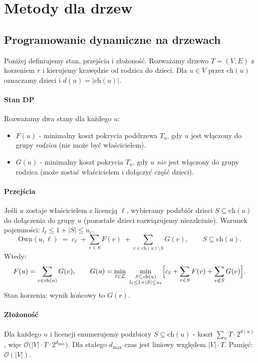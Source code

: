 \section{Metody dla drzew}

\subsection{Programowanie dynamiczne na drzewach}\label{subsec:treedp}
Poniżej definiujemy stan, przejścia i złożoność. Rozważamy drzewo $T=(V,E)$ z korzeniem $r$ i kierujemy krawędzie od rodzica do dzieci. Dla $u\in V$ przez $\mathrm{ch}(u)$ oznaczamy dzieci i $d(u)=|\mathrm{ch}(u)|$.

\paragraph{Stan DP}
Rozważamy dwa stany dla każdego $u$:
\begin{itemize}
  \item $F(u)$ - minimalny koszt pokrycia poddrzewa $T_u$, gdy $u$ jest włączony do grupy \emph{rodzica} (nie może być właścicielem).
  \item $G(u)$ - minimalny koszt pokrycia $T_u$, gdy $u$ \emph{nie} jest włączony do grupy rodzica (może zostać właścicielem i dołączyć część dzieci).
\end{itemize}

\paragraph{Przejścia} Jeśli $u$ zostaje właścicielem z licencją $\ell$, wybieramy podzbiór dzieci $S\subseteq \mathrm{ch}(u)$ do dołączenia do grupy $u$ (pozostałe dzieci rozwiązujemy niezależnie). Warunek pojemności: $l_\ell \le 1+|S| \le u_\ell$.
\[
\textstyle\mathrm{Own}(u,\ell) \;=\; c_\ell\; +\! \sum\limits_{v\in S} F(v)\; +\! \sum\limits_{v\in \mathrm{ch}(u)\setminus S} G(v),\qquad S\subseteq\mathrm{ch}(u).
\]
Wtedy:
\[
F(u)= \sum\limits_{v\in\mathrm{ch}(u)} G(v),\qquad
G(u)= \min\limits_{\ell\in\mathcal{L}}\ \min\limits_{\substack{S\subseteq\mathrm{ch}(u) \\ l_\ell\le 1+|S|\le u_\ell}} \Bigl[ c_\ell + \sum\limits_{v\in S} F(v) + \sum\limits_{v\notin S} G(v) \Bigr].
\]
Stan korzenia: wynik końcowy to $G(r)$.

\paragraph{Złożoność} Dla każdego $u$ i licencji enumerujemy podzbiory $S\subseteq\mathrm{ch}(u)$ - koszt $\sum_u T\cdot 2^{d(u)}$, więc $\mathcal{O}\bigl(|V|\cdot T\cdot 2^{d_{\max}}\bigr)$. Dla stałego $d_{\max}$ czas jest liniowy względem $|V|\cdot T$. Pamięć: $\mathcal{O}(|V|)$.

